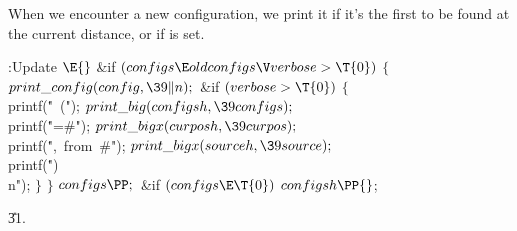 When we encounter a new configuration, we print it if it's
the
first to be found at the current distance, or if  is set.

\Y\B\4:Update \X${}\E{}$\6
\&{if} ${}(\\{configs}\E\\{oldconfigs}\V\\{verbose}>\T{0}){}$\5
${}\{{}$\1\6
${}\\{print\_config}(\\{config},\39\|n);{}$\6
\&{if} ${}(\\{verbose}>\T{0}){}$\5
${}\{{}$\1\6
\\{printf}(\.{"\ ("});\6
${}\\{print\_big}(\\{configsh},\39\\{configs});{}$\6
\\{printf}(\.{"=\#"});\6
${}\\{print\_bigx}(\\{curposh},\39\\{curpos});{}$\6
\\{printf}(\.{",\ from\ \#"});\6
${}\\{print\_bigx}(\\{sourceh},\39\\{source});{}$\6
\\{printf}(\.{")\\n"});\6
\4${}\}{}$\2\6
\4${}\}{}$\2\6
${}\\{configs}\PP;{}$\6
\&{if} ${}(\\{configs}\E\T{0}){}$\1\5
${}\\{configsh}\PP{}$;\2\par
\U31.\fi

